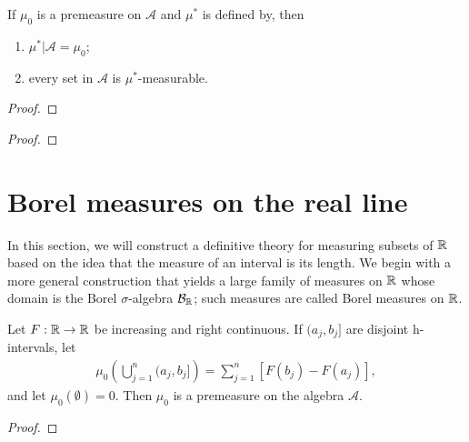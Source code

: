 \begin{proposition}
If $\mu_0$ is a premeasure on $\mathcal{A}$ and $\mu^*$ is defined by, then
\begin{enumerate}
    \item $\mu^*|\mathcal{A} = \mu_0$;
    \item every set in $\mathcal{A}$ is $\mu^*$-measurable.
\end{enumerate}
\end{proposition}

\begin{proof}
    
\end{proof}

\begin{theorem}

\end{theorem}

\begin{proof}
    
\end{proof}

\section{Borel measures on the real line}

In this section, we will construct a definitive theory for measuring subsets of $\mathbb{R}$ based on the idea that the measure of an interval is its length.
We begin with a more general construction that yields a large family of measures on $\mathbb{R}$ whose domain is the Borel $\sigma$-algebra $\mathcal{B}_{\mathbb{R}}$; such measures are called Borel measures on $\mathbb{R}$.

\begin{proposition}
Let $F:\mathbb{R} \to \mathbb{R}$ be increasing and right continuous.
If $(a_j, b_j]$ are disjoint h-intervals, let
\begin{align}
\mu_0 \left(\bigcup_{j=1}^{n} (a_j, b_j] \right) = \sum_{j=1}^{n} [F(b_j) - F(a_j)],
\end{align}
and let $\mu_0(\emptyset) = 0$.
Then $\mu_0$ is a premeasure on the algebra $\mathcal{A}$.
\end{proposition}

\begin{proof}

\end{proof}

